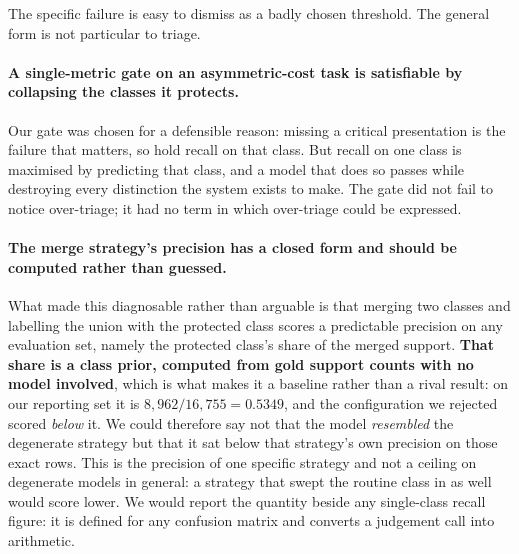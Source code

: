 \begingroup
\renewcommand{\subsection}[1]{}%
\renewcommand{\subsubsection}[1]{}%


\endgroup

The specific failure is easy to dismiss as a badly chosen threshold. The general
form is not particular to triage.

\paragraph{A single-metric gate on an asymmetric-cost task is satisfiable by
collapsing the classes it protects.} Our gate was chosen for a defensible
reason: missing a critical presentation is the failure that matters, so hold
recall on that class. But recall on one class is maximised by predicting that
class, and a model that does so passes while destroying every distinction the
system exists to make. The gate did not fail to notice over-triage; it had no
term in which over-triage could be expressed.

\paragraph{The merge strategy's precision has a closed form and should be
computed rather than guessed.} What made this diagnosable rather than arguable is
that merging two classes and labelling the union with the protected class scores a
predictable precision on any evaluation set, namely the protected class's share of
the merged support. \textbf{That share is a class prior, computed from gold
support counts with no model involved}, which is what makes it a baseline rather
than a rival result: on our reporting set it is
$8{,}962 / 16{,}755 = 0.5349$, and the configuration we rejected scored
\emph{below} it. We could therefore say not that the model \emph{resembled}
the degenerate strategy but that it sat below that strategy's own precision on
those exact rows. This is the precision of one specific strategy and not a
ceiling on degenerate models in general: a strategy that swept the routine class
in as well would score lower. We would report the quantity beside any
single-class recall figure: it is defined for any confusion matrix and converts a
judgement call into arithmetic.

